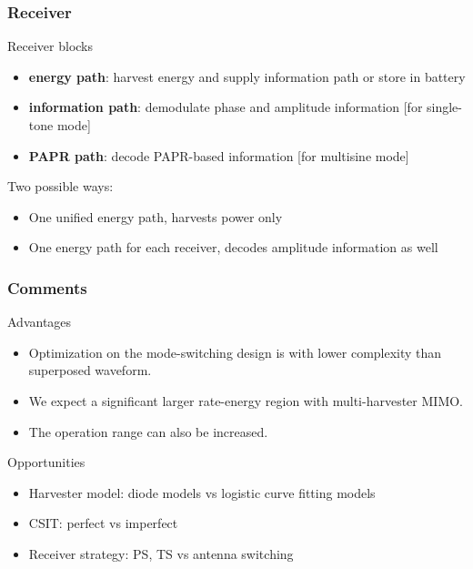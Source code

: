 \documentclass{beamer}
\begin{document}
\begin{frame}
\frametitle{Receiver}

\begin{block}{Receiver blocks}
\begin{itemize}
  \item \textbf{energy path}: harvest energy and supply information path or store in battery
  \item \textbf{information path}: demodulate phase and amplitude information [for single-tone mode]
  \item \textbf{PAPR path}: decode PAPR-based information [for multisine mode]
\end{itemize}
\end{block}

Two possible ways:

\begin{itemize}
  \item One unified energy path, harvests power only
  \item One energy path for each receiver, decodes amplitude information as well
\end{itemize}

\end{frame}


\begin{frame}
\frametitle{Comments}

\begin{block}{Advantages}
\begin{itemize}
  \item Optimization on the mode-switching design is with lower complexity than superposed waveform.
  \item We expect a significant larger rate-energy region with multi-harvester MIMO.
  \item The operation range can also be increased.
\end{itemize}
\end{block}

\begin{block}{Opportunities}
\begin{itemize}
  \item Harvester model: diode models vs logistic curve fitting models \cite{Boshkovska2015}
  \item CSIT: perfect vs imperfect
  \item Receiver strategy: PS, TS vs antenna switching \cite{Liu2013}
\end{itemize}
\end{block}

\end{frame}
\end{document}
